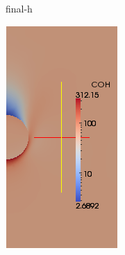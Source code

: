 \documentclass[a0,portrait]{a0poster}
\begin{document}
\begin{multicols}{2}
\begin{multicols}{2}
\begin{multicols}{2}
\begin{center}
		{final-h}
	\end{center}

\columnbreak

	\begin{center}\vspace{1cm}
		\includegraphics[width=1\linewidth]
		{final-oh}
	\end{center}
\end{multicols}





\end{multicols}
\end{multicols}
\end{document}
